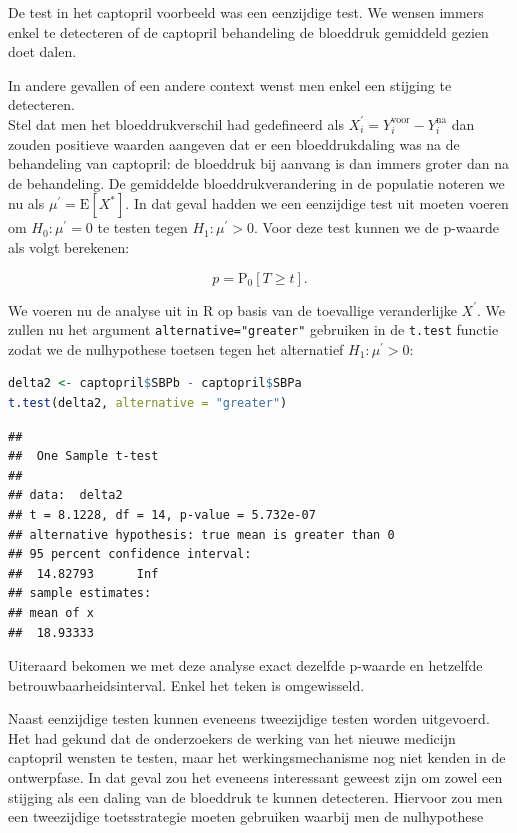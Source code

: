 \documentclass[
  12pt,dutch,coursenotes]{book}
\newcommand{\passthrough}[1]{#1}
\begin{document}
De test in het captopril voorbeeld was een eenzijdige test. We wensen immers enkel te detecteren of de captopril behandeling de bloeddruk gemiddeld gezien doet dalen.

In andere gevallen of een andere context wenst men enkel een stijging te detecteren.\\
Stel dat men het bloeddrukverschil had gedefineerd als \(X_{i}^\prime=Y_{i}^\text{voor}-Y_{i}^\text{na}\) dan zouden positieve waarden aangeven dat er een bloeddrukdaling was na de behandeling van captopril: de bloeddruk bij aanvang is dan immers groter dan na de behandeling.
De gemiddelde bloeddrukverandering in de populatie noteren we nu als \(\mu^\prime=\text{E}[X^*]\).
In dat geval hadden we een eenzijdige test uit moeten voeren om \(H_0: \mu^\prime=0\) te testen tegen \(H_1: \mu^\prime>0\).
Voor deze test kunnen we de p-waarde als volgt berekenen:

\[p=\text{P}_0\left[T\geq t\right].\]

We voeren nu de analyse uit in R op basis van de toevallige veranderlijke \(X^\prime\). We zullen nu het argument \passthrough{\lstinline!alternative="greater"!} gebruiken in de \passthrough{\lstinline!t.test!} functie zodat we de nulhypothese toetsen tegen het alternatief \(H_1: \mu^\prime>0\):

\begin{lstlisting}[language=R]
delta2 <- captopril$SBPb - captopril$SBPa
t.test(delta2, alternative = "greater")
\end{lstlisting}

\begin{lstlisting}
## 
##  One Sample t-test
## 
## data:  delta2
## t = 8.1228, df = 14, p-value = 5.732e-07
## alternative hypothesis: true mean is greater than 0
## 95 percent confidence interval:
##  14.82793      Inf
## sample estimates:
## mean of x 
##  18.93333
\end{lstlisting}

Uiteraard bekomen we met deze analyse exact dezelfde p-waarde en hetzelfde betrouwbaarheidsinterval. Enkel het teken is omgewisseld.

Naast eenzijdige testen kunnen eveneens tweezijdige testen worden uitgevoerd.
Het had gekund dat de onderzoekers de werking van het nieuwe medicijn captopril wensten te testen, maar het werkingsmechanisme nog niet kenden in de ontwerpfase. In dat geval zou het eveneens interessant geweest zijn om zowel een stijging als een daling van de bloeddruk te kunnen detecteren.
Hiervoor zou men een tweezijdige toetsstrategie moeten gebruiken waarbij men de nulhypothese
\end{document}
